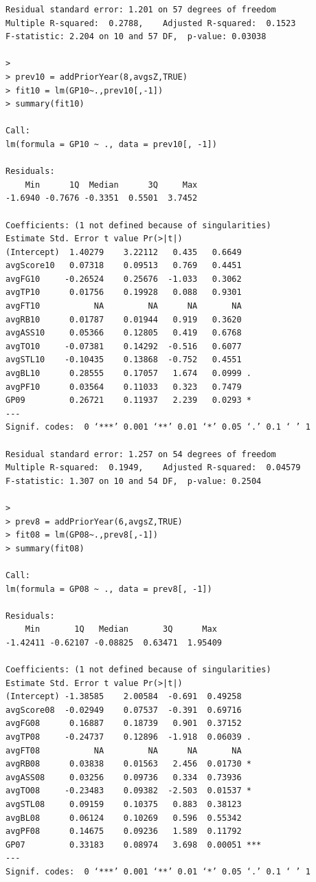 \documentclass[]{scrartcl}
\begin{document}
\begin{verbatim}
Residual standard error: 1.201 on 57 degrees of freedom
Multiple R-squared:  0.2788,	Adjusted R-squared:  0.1523 
F-statistic: 2.204 on 10 and 57 DF,  p-value: 0.03038

> 
> prev10 = addPriorYear(8,avgsZ,TRUE)
> fit10 = lm(GP10~.,prev10[,-1])
> summary(fit10)

Call:
lm(formula = GP10 ~ ., data = prev10[, -1])

Residuals:
    Min      1Q  Median      3Q     Max 
-1.6940 -0.7676 -0.3351  0.5501  3.7452 

Coefficients: (1 not defined because of singularities)
Estimate Std. Error t value Pr(>|t|)  
(Intercept)  1.40279    3.22112   0.435   0.6649  
avgScore10   0.07318    0.09513   0.769   0.4451  
avgFG10     -0.26524    0.25676  -1.033   0.3062  
avgTP10      0.01756    0.19928   0.088   0.9301  
avgFT10           NA         NA      NA       NA  
avgRB10      0.01787    0.01944   0.919   0.3620  
avgASS10     0.05366    0.12805   0.419   0.6768  
avgTO10     -0.07381    0.14292  -0.516   0.6077  
avgSTL10    -0.10435    0.13868  -0.752   0.4551  
avgBL10      0.28555    0.17057   1.674   0.0999 .
avgPF10      0.03564    0.11033   0.323   0.7479  
GP09         0.26721    0.11937   2.239   0.0293 *
---
Signif. codes:  0 ‘***’ 0.001 ‘**’ 0.01 ‘*’ 0.05 ‘.’ 0.1 ‘ ’ 1

Residual standard error: 1.257 on 54 degrees of freedom
Multiple R-squared:  0.1949,	Adjusted R-squared:  0.04579 
F-statistic: 1.307 on 10 and 54 DF,  p-value: 0.2504

> 
> prev8 = addPriorYear(6,avgsZ,TRUE)
> fit08 = lm(GP08~.,prev8[,-1])
> summary(fit08)

Call:
lm(formula = GP08 ~ ., data = prev8[, -1])

Residuals:
    Min       1Q   Median       3Q      Max 
-1.42411 -0.62107 -0.08825  0.63471  1.95409 

Coefficients: (1 not defined because of singularities)
Estimate Std. Error t value Pr(>|t|)    
(Intercept) -1.38585    2.00584  -0.691  0.49258    
avgScore08  -0.02949    0.07537  -0.391  0.69716    
avgFG08      0.16887    0.18739   0.901  0.37152    
avgTP08     -0.24737    0.12896  -1.918  0.06039 .  
avgFT08           NA         NA      NA       NA    
avgRB08      0.03838    0.01563   2.456  0.01730 *  
avgASS08     0.03256    0.09736   0.334  0.73936    
avgTO08     -0.23483    0.09382  -2.503  0.01537 *  
avgSTL08     0.09159    0.10375   0.883  0.38123    
avgBL08      0.06124    0.10269   0.596  0.55342    
avgPF08      0.14675    0.09236   1.589  0.11792    
GP07         0.33183    0.08974   3.698  0.00051 ***
---
Signif. codes:  0 ‘***’ 0.001 ‘**’ 0.01 ‘*’ 0.05 ‘.’ 0.1 ‘ ’ 1


\end{verbatim}
\end{document}
